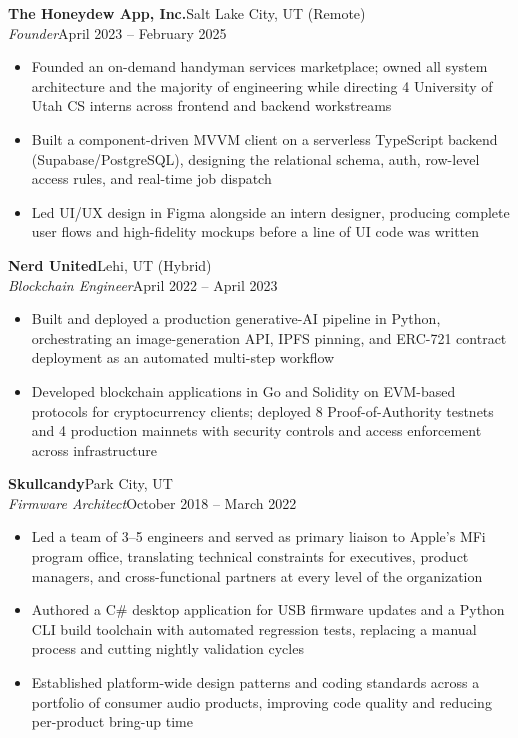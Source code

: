 \documentclass[10.5pt, letterpaper]{article}
\newcommand{\jobentry}[4]{%
  \noindent
  \textbf{\color{accent}#1}\hfill\textcolor{muted}{\small #2}\\
  \textit{#3}\hfill\textcolor{muted}{\small #4}%
}
\begin{document}
\vspace{5pt}

\jobentry{The Honeydew App, Inc.}{Salt Lake City, UT (Remote)}{Founder}{April 2023 -- February 2025}
\begin{itemize}
  \item Founded an on-demand handyman services marketplace; owned all system
        architecture and the majority of engineering while directing 4 University
        of Utah CS interns across frontend and backend workstreams
  \item Built a component-driven MVVM client on a serverless TypeScript backend
        (Supabase/PostgreSQL), designing the relational schema, auth, row-level
        access rules, and real-time job dispatch
  \item Led UI/UX design in Figma alongside an intern designer, producing complete
        user flows and high-fidelity mockups before a line of UI code was written
\end{itemize}

\vspace{5pt}

\jobentry{Nerd United}{Lehi, UT (Hybrid)}{Blockchain Engineer}{April 2022 -- April 2023}
\begin{itemize}
  \item Built and deployed a production generative-AI pipeline in Python, orchestrating
        an image-generation API, IPFS pinning, and ERC-721 contract deployment as an
        automated multi-step workflow
  \item Developed blockchain applications in Go and Solidity on EVM-based protocols for
        cryptocurrency clients; deployed 8 Proof-of-Authority testnets and 4 production
        mainnets with security controls and access enforcement across infrastructure
\end{itemize}

\vspace{5pt}

\jobentry{Skullcandy}{Park City, UT}{Firmware Architect}{October 2018 -- March 2022}
\begin{itemize}
  \item Led a team of 3--5 engineers and served as primary liaison to Apple's MFi
        program office, translating technical constraints for executives, product
        managers, and cross-functional partners at every level of the organization
  \item Authored a C\# desktop application for USB firmware updates and a Python CLI
        build toolchain with automated regression tests, replacing a manual process
        and cutting nightly validation cycles
  \item Established platform-wide design patterns and coding standards across a
        portfolio of consumer audio products, improving code quality and reducing
        per-product bring-up time
\end{itemize}
\end{document}

